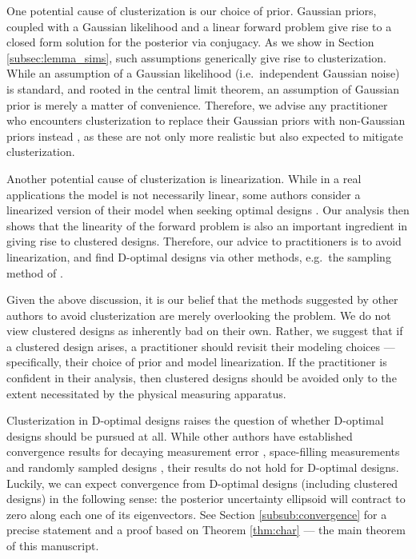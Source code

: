 One potential cause of clusterization is our choice of prior. Gaussian
priors, coupled with a Gaussian likelihood and a linear forward
problem give rise to a closed form solution for the posterior via
conjugacy. As we show in Section \ref{subsec:lemma_sims}, such
assumptions generically give rise to clusterization. While an
assumption of a Gaussian likelihood (i.e.~independent Gaussian noise)
is standard, and rooted in the central limit theorem, an assumption of
Gaussian prior is merely a matter of convenience. Therefore, we advise
any practitioner who encounters clusterization to replace their
Gaussian priors with non-Gaussian priors instead \cite{hosseini2017,
  hosseini2019}, as these are not only more realistic but also
expected to mitigate clusterization.

Another potential cause of clusterization is linearization. While in a
real applications the model is not necessarily linear, some authors
consider a linearized version of their model when seeking optimal
designs \cite{fedorov1996, neitzel2019sparse}. Our analysis then shows
that the linearity of the forward problem is also an important
ingredient in giving rise to clustered designs. Therefore, our advice
to practitioners is to avoid linearization, and find D-optimal designs
via other methods, e.g.~the sampling method of \cite{ryan2003}.

Given the above discussion, it is our belief that the methods
suggested by other authors to avoid clusterization are merely
overlooking the problem. We do not view clustered designs as
inherently bad on their own. Rather, we suggest that if a clustered
design arises, a practitioner should revisit their modeling choices
--- specifically, their choice of prior and model linearization. If
the practitioner is confident in their analysis, then clustered
designs should be avoided only to the extent necessitated by the
physical measuring apparatus.

Clusterization in D-optimal designs raises the question of whether
D-optimal designs should be pursued at all. While other authors have
established convergence results for decaying measurement error
\cite{knapik2011}, space-filling measurements \cite{teckentrup2020}
and randomly sampled designs \cite{nickl2023}, their results do not
hold for D-optimal designs. Luckily, we can expect convergence from
D-optimal designs (including clustered designs) in the following
sense: the posterior uncertainty ellipsoid will contract to zero along
each one of its eigenvectors. See Section \ref{subsub:convergence} for
a precise statement and a proof based on Theorem \ref{thm:char} ---
the main theorem of this manuscript.


